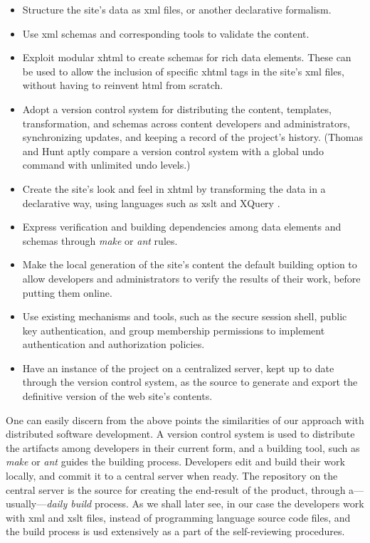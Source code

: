 \documentclass{elsart}
\begin{document}
\begin{itemize}
\item Structure the site's data as {\sc xml} files,
or another declarative formalism.
\item Use {\sc xml} schemas and corresponding tools to validate the content.
\item Exploit modular {\sc xhtml} \cite{W3C_MODULAR_XHTML} to create schemas for rich
data elements.
These can be used to allow the inclusion of specific {\sc xhtml} tags
in the site's {\sc xml} files, without having to reinvent {\sc html}
from scratch.
\item Adopt a version control system for distributing the content,
templates, transformation, and schemas across content developers and
administrators, synchronizing updates, and keeping a record of the project's history.
(Thomas and Hunt \cite{HT00} aptly compare a version control system
with a global undo command with unlimited undo levels.)
\item Create the site's look and feel in {\sc xhtml} by transforming
the data in a declarative way, using languages such as {\sc xslt} and XQuery \cite{HM01,NOV03}.
\item Express verification and building dependencies among
data elements and schemas through {\em make} \cite{MAKE} or {\em ant}
\cite{JAKARTA_ANT} rules.
\item Make the local generation of the site's content the default
building option to allow developers and administrators to verify
the results of  their work, before putting them online.
\item Use existing mechanisms and tools, such as the secure session shell,
public key authentication, and group membership permissions to implement
authentication and authorization policies.
\item Have an instance of the project on a centralized server, kept up to
date through the version control system, as the source to generate and export
the definitive version of the web site's contents.
\end{itemize}

One can easily discern from the above points the similarities of our
approach with distributed software development.
A version control system is used to distribute the artifacts among
developers in their current form, and a building tool, such as {\em make}
or {\em ant} guides the building process.
Developers edit and build their work locally, and commit it to a central server when ready.
The repository on the central server is the source for creating the end-result
of the product, through a---usually---{\em daily build} process.
As we shall later see, in our case the developers work with {\sc xml} and {\sc xslt}
files, instead of programming language source code files, and the build process
is usd extensively as a part of the self-reviewing procedures.
\end{document}

